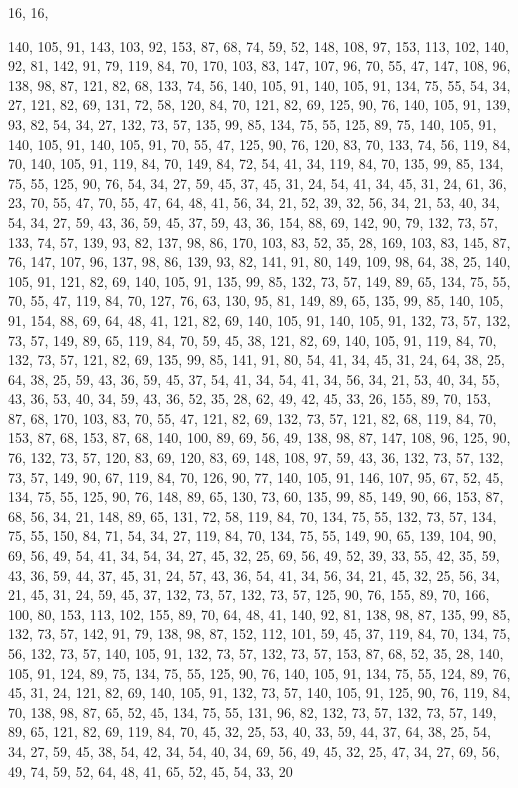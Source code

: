 16, 16,

140, 105, 91, 143, 103, 92, 153, 87, 68, 74, 59, 52, 148, 108, 97, 153,
113, 102, 140, 92, 81, 142, 91, 79, 119, 84, 70, 170, 103, 83, 147, 107,
96, 70, 55, 47, 147, 108, 96, 138, 98, 87, 121, 82, 68, 133, 74, 56,
140, 105, 91, 140, 105, 91, 134, 75, 55, 54, 34, 27, 121, 82, 69, 131,
72, 58, 120, 84, 70, 121, 82, 69, 125, 90, 76, 140, 105, 91, 139, 93,
82, 54, 34, 27, 132, 73, 57, 135, 99, 85, 134, 75, 55, 125, 89, 75,
140, 105, 91, 140, 105, 91, 140, 105, 91, 70, 55, 47, 125, 90, 76, 120,
83, 70, 133, 74, 56, 119, 84, 70, 140, 105, 91, 119, 84, 70, 149, 84,
72, 54, 41, 34, 119, 84, 70, 135, 99, 85, 134, 75, 55, 125, 90, 76,
54, 34, 27, 59, 45, 37, 45, 31, 24, 54, 41, 34, 45, 31, 24, 61,
36, 23, 70, 55, 47, 70, 55, 47, 64, 48, 41, 56, 34, 21, 52, 39,
32, 56, 34, 21, 53, 40, 34, 54, 34, 27, 59, 43, 36, 59, 45, 37,
59, 43, 36, 154, 88, 69, 142, 90, 79, 132, 73, 57, 133, 74, 57, 139,
93, 82, 137, 98, 86, 170, 103, 83, 52, 35, 28, 169, 103, 83, 145, 87,
76, 147, 107, 96, 137, 98, 86, 139, 93, 82, 141, 91, 80, 149, 109, 98,
64, 38, 25, 140, 105, 91, 121, 82, 69, 140, 105, 91, 135, 99, 85, 132,
73, 57, 149, 89, 65, 134, 75, 55, 70, 55, 47, 119, 84, 70, 127, 76,
63, 130, 95, 81, 149, 89, 65, 135, 99, 85, 140, 105, 91, 154, 88, 69,
64, 48, 41, 121, 82, 69, 140, 105, 91, 140, 105, 91, 132, 73, 57, 132,
73, 57, 149, 89, 65, 119, 84, 70, 59, 45, 38, 121, 82, 69, 140, 105,
91, 119, 84, 70, 132, 73, 57, 121, 82, 69, 135, 99, 85, 141, 91, 80,
54, 41, 34, 45, 31, 24, 64, 38, 25, 64, 38, 25, 59, 43, 36, 59,
45, 37, 54, 41, 34, 54, 41, 34, 56, 34, 21, 53, 40, 34, 55, 43,
36, 53, 40, 34, 59, 43, 36, 52, 35, 28, 62, 49, 42, 45, 33, 26,
155, 89, 70, 153, 87, 68, 170, 103, 83, 70, 55, 47, 121, 82, 69, 132,
73, 57, 121, 82, 68, 119, 84, 70, 153, 87, 68, 153, 87, 68, 140, 100,
89, 69, 56, 49, 138, 98, 87, 147, 108, 96, 125, 90, 76, 132, 73, 57,
120, 83, 69, 120, 83, 69, 148, 108, 97, 59, 43, 36, 132, 73, 57, 132,
73, 57, 149, 90, 67, 119, 84, 70, 126, 90, 77, 140, 105, 91, 146, 107,
95, 67, 52, 45, 134, 75, 55, 125, 90, 76, 148, 89, 65, 130, 73, 60,
135, 99, 85, 149, 90, 66, 153, 87, 68, 56, 34, 21, 148, 89, 65, 131,
72, 58, 119, 84, 70, 134, 75, 55, 132, 73, 57, 134, 75, 55, 150, 84,
71, 54, 34, 27, 119, 84, 70, 134, 75, 55, 149, 90, 65, 139, 104, 90,
69, 56, 49, 54, 41, 34, 54, 34, 27, 45, 32, 25, 69, 56, 49, 52,
39, 33, 55, 42, 35, 59, 43, 36, 59, 44, 37, 45, 31, 24, 57, 43,
36, 54, 41, 34, 56, 34, 21, 45, 32, 25, 56, 34, 21, 45, 31, 24,
59, 45, 37, 132, 73, 57, 132, 73, 57, 125, 90, 76, 155, 89, 70, 166,
100, 80, 153, 113, 102, 155, 89, 70, 64, 48, 41, 140, 92, 81, 138, 98,
87, 135, 99, 85, 132, 73, 57, 142, 91, 79, 138, 98, 87, 152, 112, 101,
59, 45, 37, 119, 84, 70, 134, 75, 56, 132, 73, 57, 140, 105, 91, 132,
73, 57, 132, 73, 57, 153, 87, 68, 52, 35, 28, 140, 105, 91, 124, 89,
75, 134, 75, 55, 125, 90, 76, 140, 105, 91, 134, 75, 55, 124, 89, 76,
45, 31, 24, 121, 82, 69, 140, 105, 91, 132, 73, 57, 140, 105, 91, 125,
90, 76, 119, 84, 70, 138, 98, 87, 65, 52, 45, 134, 75, 55, 131, 96,
82, 132, 73, 57, 132, 73, 57, 149, 89, 65, 121, 82, 69, 119, 84, 70,
45, 32, 25, 53, 40, 33, 59, 44, 37, 64, 38, 25, 54, 34, 27, 59,
45, 38, 54, 42, 34, 54, 40, 34, 69, 56, 49, 45, 32, 25, 47, 34,
27, 69, 56, 49, 74, 59, 52, 64, 48, 41, 65, 52, 45, 54, 33, 20
